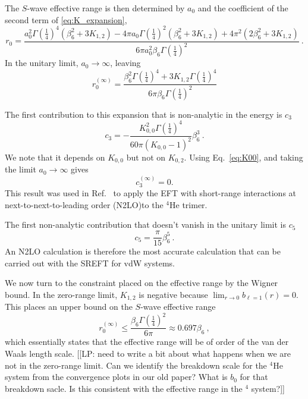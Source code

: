 \documentclass[aps,preprint,superscriptaddress]{revtex4-1}
\begin{document}
The $S$-wave effective range is then determined by $a_0$ and the coefficient of
the second term of \eqref{eq:K_expansion},
\begin{equation}
  r_0 = \frac{a_0^2 \Gamma \left(\frac{1}{4}\right)^4 \left(\beta_6 ^2+3
  K_{1,2}\right)-4 \pi  a_0 \Gamma \left(\frac{1}{4}\right)^2 \left(\beta_6 ^2+3
  K_{1,2}\right)+4 \pi ^2 \left(2 \beta_6 ^2+3 K_{1,2}\right)}{6 \pi  a_0^2 \beta_6
\Gamma \left(\frac{1}{4}\right)^2}~.
\end{equation}
In the unitary limit, $a_0\rightarrow\infty$, leaving
\begin{equation}
  r_0^{(\infty)} = \frac{\beta_6 ^2 \Gamma \left(\frac{1}{4}\right)^4+3 K_{1,2} \Gamma \left(\frac{1}{4}\right)^4}{6 \pi  \beta_6  \Gamma \left(\frac{1}{4}\right)^2}
\end{equation}

The first contribution to this expansion that is non-analytic in the
energy is $c_3$
\begin{equation}
  \label{eq:c3}
  c_3 = - \frac{K_{0,0}^2\Gamma(\frac{1}{4})^4}{60 \pi (K_{0,0}-1)^2}\beta_6^3~.
\end{equation}
We note that it depends on $K_{0,0}$ but not on $K_{0,2}$. Using
Eq.~\eqref{eq:K00}, and taking the limit $a_0 \rightarrow \infty$
gives
\begin{equation}
  \label{eq:c3-unitary}
  c_3^{(\infty)}=0.
\end{equation}
This result was used in Ref.~\cite{Ji:2012nj} to apply the EFT with
short-range interactions at next-to-next-to-leading order (N2LO)to the
$^4$He trimer.

The first non-analytic contribution that doesn't vanish in the unitary
limit is $c_5$
\begin{equation}
  \label{eq:c5}
  c_5 = \frac{\pi}{15}\beta_6^5~.
\end{equation}
An N2LO calculation is therefore the most accurate calculation that
can be carried out with the SREFT for vdW systems.

We now turn to the constraint placed on the effective range by the
Wigner bound. In the zero-range limit, $K_{1,2}$  is negative
because $\lim_{r\rightarrow0} b_{\ell=1}(r) = 0$.  This
places an upper bound on the $S$-wave effective range
\begin{equation}
  r_0^{(\infty)} \le \frac{\beta_6  \Gamma
    \left(\frac{1}{4}\right)^2}{6 \pi }\approx 0.697 \beta_6~,
\end{equation}
which essentially states that the effective range will be of order of
the van der Waals length scale.  [[LP: need to write a bit about what
happens when we are not in the zero-range limit. Can we identify the
breakdown scale for the $^4$He system from the convergence plots in
our old paper? What is $b_0$ for that breakdown sacle. Is this
consistent with the effective range in the ${}^4$ system?]]
\end{document}
